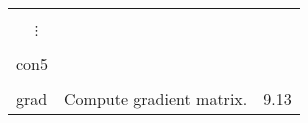 \begin{center}
\begin{tabular}{lll}
\vspace{-7mm}& &\\
\hspace{1.5em}\ \ \,$\vdots$ & &\\
\vspace{-7mm}& &\\
\hspace{1.5em}con5 & & \\   \vspace{-3mm}& &\\
\hspace{1.5em}grad    &    Compute gradient matrix.         &      \hspace{2em}9.13\\
\end{tabular}
\end{center}

